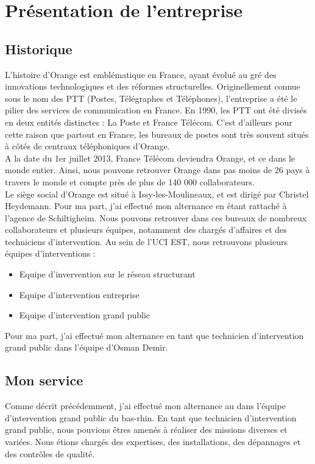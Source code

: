 \documentclass[12pt, a4paper]{article}
\begin{document}
\newpage
\section{Présentation de l'entreprise}
\subsection{Historique}
L'histoire d'Orange est emblématique en France, ayant évolué au gré des
innovations technologiques et des réformes structurelles. Originellement connue
sous le nom des PTT (Postes, Télégraphes et Téléphones), 
l'entreprise a été le pilier des services de communication en
France. En 1990, les PTT ont été divisés en deux entités distinctes : La Poste et France Télécom.
C'est d'ailleurs pour cette raison que partout en France, les bureaux de postes 
sont très souvent situés à côtés de centraux téléphoniques d'Orange.\\

A la date du 1er juillet 2013, France Télécom deviendra Orange, et ce dans le monde entier.
Ainsi, nous pouvons retrouver Orange dans pas moins de 26 pays à travers le monde et 
compte près de plus de 140 000 collaborateurs.\\

Le siège social d'Orange est situé à Issy-les-Moulineaux,
et est dirigé par Christel Heydemann. Pour ma part, 
j'ai effectué mon alternance en étant rattaché 
à l'agence de Schiltigheim. Nous pouvons retrouver 
dans ces bureaux de nombreux collaborateurs et 
plusieurs équipes, notamment des chargés d'affaires
et des techniciens d'intervention. Au sein de l'UCI EST,
nous retrouvons plusieurs équipes d'interventions :\\

\begin{itemize}
	\item Equipe d'invervention sur le réseau structurant 
	\item Equipe d'intervention entreprise
	\item Equipe d'intervention grand public\\
\end{itemize}

Pour ma part, j'ai effectué mon alternance en tant que
technicien d'intervention grand public dans l'équipe
d'Osman Demir. 


\subsection{Mon service}
Comme décrit précédemment, j'ai effectué mon alternance
au dans l'équipe d'intervention grand public 
du bas-rhin. En tant que technicien d'intervention grand public,
nous pouvions êtres amenés à réaliser des missions diverses et 
variées. Nous étions chargés des 
expertises, des installations, des dépannages et 
des contrôles de qualité.\\
\end{document}
